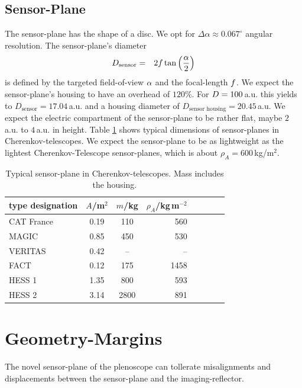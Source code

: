 \documentclass[11pt,a4paper,oneside,titlepage]{article}
\begin{document}
\subsection{Sensor-Plane}
%
The sensor-plane has the shape of a disc.
%
We opt for \mbox{$\Delta \alpha \approx 0.067^\circ$} angular resolution.
%
The sensor-plane's diameter
%
\begin{eqnarray}
D_\text{sensor} &=& 2 f \tan \left( \frac{\alpha} {2}\right)
\end{eqnarray}
%
is defined by the targeted field-of-view $\alpha$ and the focal-length $f$.
%
We expect the sensor-plane's housing to have an overhead of $120\%$.
%
For $D=100\,$a.u. this yields to \mbox{$D_\text{sensor} = 17.04\,$a.u.} and a housing diameter of \mbox{$D_\text{sensor housing} = 20.45\,$a.u.}
%
We expect the electric compartment of the sensor-plane to be rather flat, maybe $2\,$a.u. to $4\,$a.u. in height.
%
Table \ref{TabFullImageSensors} shows typical dimensions of sensor-planes in Cherenkov-telescopes.
%
We expect the sensor-plane to be as lightweight as the lightest Cherenkov-Telescope sensor-planes, which is about $\rho_A = 600\,$kg/m$^2$.
%
\begin{table}[H]
    \begin{center}
        \begin{tabular}{lccrrrrr}
            type designation & $A$/m$^2$ & $m$/kg & $\rho_A$/kg\,m$^{-2}$\\
            \toprule
            CAT France & 0.19 & 110 & 560\\
            MAGIC      & 0.85 & 450 & 530\\
            VERITAS    & 0.42 & -- & -- \\
            FACT       & 0.12 & 175 & 1458\\
            HESS 1     & 1.35 & 800 & 593\\
            HESS 2     & 3.14 & 2800 & 891\\
            \bottomrule
        \end{tabular}
        \caption[]{Typical sensor-plane in Cherenkov-telescopes. Mass includes the housing.}
        \label{TabFullImageSensors}
    \end{center}
\end{table}
\section{Geometry-Margins}
%
The novel sensor-plane of the plenoscope can tollerate misalignments and displacements between the sensor-plane and the imaging-reflector.
\end{document}
